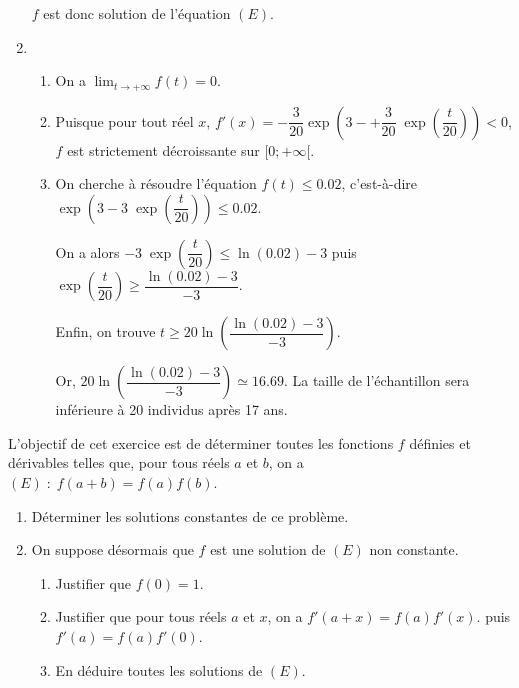 \documentclass[11pt,fleqn, openany]{book} %
\begin{document}
\begin{solution}
\begin{enumerate}
 \(f\) est donc solution de l'équation \((E)\).
\item  

\begin{enumerate}\item  On a \(\lim_{t \to +\infty} f(t)=0\).
\item  Puisque pour tout réel \(x\), \(f'(x)=-\dfrac{3}{20}\exp\left(3-+\dfrac{3}{20}\;\exp\left(\dfrac{t}{20}\right)\right)<0\), \(f\) est strictement décroissante sur \([0;+\infty[\).
\item  On cherche à résoudre l'équation \(f(t)\leqslant 0.02\), c'est-à-dire $\exp\left(3-3\;\exp\left(\dfrac{t}{20}\right)\right) \leqslant 0.02$.

On a alors $ -3\;\exp\left(\dfrac{t}{20}\right) \leqslant \ln(0.02)-3$ puis $\exp\left(\dfrac{t}{20}\right) \geqslant \dfrac{\ln(0.02)-3}{-3}$.

Enfin, on trouve $t \geqslant 20 \ln\left( \dfrac{\ln(0.02)-3}{-3} \right)$.

 
Or,  \(20 \ln\left( \dfrac{\ln(0.02)-3}{-3} \right) \simeq 16.69\).
 La taille de l'échantillon sera inférieure à 20 individus après 17 ans.
 \end{enumerate}
 \end{enumerate}

\end{solution}

\begin{exercise}[topic=diff04]L'objectif de cet exercice est de déterminer toutes les fonctions $f$ définies et dérivables telles que, pour tous réels $a$ et $b$, on a $(E) \; : \; f(a+b)=f(a)f(b)$.
\begin{enumerate}
\item Déterminer les solutions constantes de ce problème.
\item On suppose désormais que $f$ est une solution de $(E)$ non constante.
\begin{enumerate}
\item Justifier que $f(0)=1$.
\item Justifier que pour tous réels $a$ et $x$, on a $f'(a+x)=f(a)f'(x)$. puis $f'(a)=f(a)f'(0)$.
\item En déduire toutes les solutions de $(E)$.
\end{enumerate}
\end{enumerate}
\end{exercise}
\end{document}
